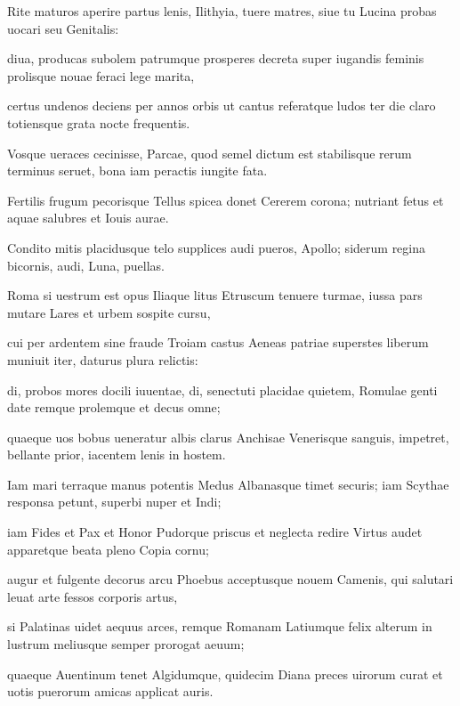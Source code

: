 \documentclass{book}
\begin{document}
Rite maturos aperire partus
 lenis, Ilithyia, tuere matres,
 siue tu Lucina probas uocari               
      seu Genitalis:
 
diua, producas subolem patrumque
 prosperes decreta super iugandis
 feminis prolisque nouae feraci
      lege marita,               
 
certus undenos deciens per annos
 orbis ut cantus referatque ludos
 ter die claro totiensque grata
      nocte frequentis.
 
Vosque ueraces cecinisse, Parcae,               
 quod semel dictum est stabilisque rerum
 terminus seruet, bona iam peractis
      iungite fata.
 
Fertilis frugum pecorisque Tellus
 spicea donet Cererem corona;               
 nutriant fetus et aquae salubres
      et Iouis aurae.
 
Condito mitis placidusque telo
 supplices audi pueros, Apollo;
 siderum regina bicornis, audi,                
     Luna, puellas.
 
Roma si uestrum est opus Iliaque
 litus Etruscum tenuere turmae,
 iussa pars mutare Lares et urbem
      sospite cursu,               
 
cui per ardentem sine fraude Troiam
 castus Aeneas patriae superstes
 liberum muniuit iter, daturus
      plura relictis:
 
di, probos mores docili iuuentae,               
 di, senectuti placidae quietem,
 Romulae genti date remque prolemque
      et decus omne;
 
quaeque uos bobus ueneratur albis
 clarus Anchisae Venerisque sanguis,               
 impetret, bellante prior, iacentem
      lenis in hostem.
 
Iam mari terraque manus potentis
 Medus Albanasque timet securis;
 iam Scythae responsa petunt, superbi               
      nuper et Indi;
 
iam Fides et Pax et Honor Pudorque
 priscus et neglecta redire Virtus
 audet apparetque beata pleno
      Copia cornu;               
 
augur et fulgente decorus arcu
 Phoebus acceptusque nouem Camenis,
 qui salutari leuat arte fessos
      corporis artus,
 
si Palatinas uidet aequus arces,                
remque Romanam Latiumque felix
 alterum in lustrum meliusque semper
      prorogat aeuum;
 
quaeque Auentinum tenet Algidumque,
 quidecim Diana preces uirorum               
 curat et uotis puerorum amicas
      applicat auris.
 
\end{document}
